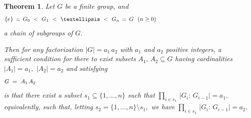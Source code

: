\documentclass[10pt,a4paper]{amsart}
\newtheorem{theorem}{Theorem}
\begin{document}
\begin{theorem}\label{T.main}
Let $G$ be a finite group, and
%
\begin{equation}\begin{minipage}[c]{35pc}\label{d.G0Gn}
$\{e\}\,=\,G_0\ <\ G_1\ <\ \dots\ <\ G_n\,=\,G$ \ $(n\geq 0)$
\end{minipage}\end{equation}
%
a chain of subgroups of $G.$

Then for any factorization $|G| = a_1\,a_2$ with $a_1$ and $a_2$
positive integers, a {\em sufficient}
condition for there to exist subsets $A_1,\,A_2\subseteq G$
having cardinalities $|A_1|=a_1,$ $|A_2|=a_2$ and satisfying
%
\begin{equation}\begin{minipage}[c]{35pc}\label{d.A1A2}
$G\ =\ A_1\,A_2$
\end{minipage}\end{equation}
%
is that there exist a subset $s_1\subseteq\{1,\dots,n\}$
such that $\prod_{i\in s_1}\,|G_i:\,G_{i-1}| = a_1,$
equivalently, such that, letting $s_2=\{1,\dots,n\}\setminus s_1,$
we have $\prod_{i\in s_2}\,|G_i:\,G_{i-1}| = a_2.$
\end{theorem}
\end{document}
